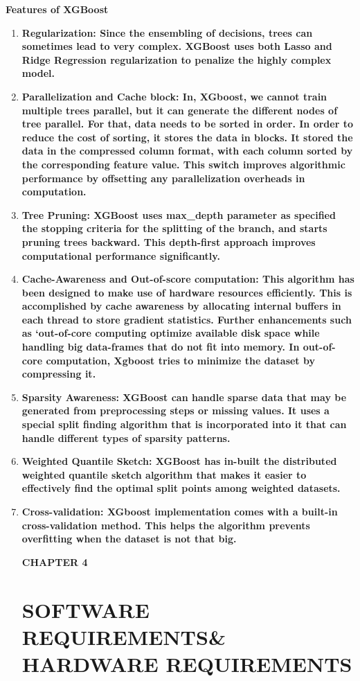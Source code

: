 \documentclass[12pt]{article}
\begin{document}
\textbf{Features of XGBoost}
\begin{enumerate}
\item \bf{Regularization:} Since the ensembling of decisions, trees can sometimes lead to very complex. XGBoost uses both Lasso and Ridge Regression regularization to penalize the highly complex model.
\item \bf{Parallelization} and Cache block: In, XGboost, we cannot train multiple trees parallel, but it can generate the different nodes of tree parallel. For that, data needs to be sorted in order. In order to reduce the cost of sorting, it stores the data in blocks. It stored the data in the compressed column format, with each column sorted by the corresponding feature value. This switch improves algorithmic performance by offsetting any parallelization overheads in computation.
\item \bf{Tree Pruning:}  XGBoost uses max_depth parameter as specified the stopping criteria for the splitting of the branch, and starts pruning trees backward. This depth-first approach improves computational performance significantly.
\item \bf{Cache-Awareness and Out-of-score computation:} This algorithm has been designed to make use of hardware resources efficiently. This is accomplished by cache awareness by allocating internal buffers in each thread to store gradient statistics. Further enhancements such as ‘out-of-core computing optimize available disk space while handling big data-frames that do not fit into memory. In out-of-core computation, Xgboost tries to minimize the dataset by compressing it.
\item \bf{Sparsity Awareness:} XGBoost can handle sparse data that may be generated from preprocessing steps or missing values. It uses a special split finding algorithm that is incorporated into it that can handle different types of sparsity patterns.
\item \bf{Weighted Quantile Sketch:} XGBoost has in-built the distributed weighted quantile sketch algorithm that makes it easier to effectively find the optimal split points among weighted datasets.
\item \bf{Cross-validation:} XGboost implementation comes with a built-in cross-validation method. This helps the algorithm prevents overfitting when the dataset is not that big.

\newpage
\begin{flushleft}\textbf{CHAPTER 4} \end{flushleft}
\begin{flushleft}\section{SOFTWARE REQUIREMENTS\&
HARDWARE REQUIREMENTS} \end{flushleft}
\vspace*{10px}

\end{enumerate}
\end{document}
